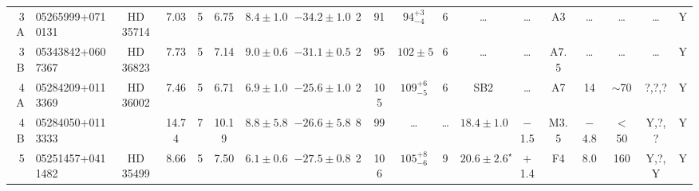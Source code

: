\documentclass[usenatbib]{mnras}
\begin{document}
\begin{landscape}
\begin{table}
\begin{tabular}{r l c c c c c c c c c c c c c c c c c}
3A & 05265999+0710131   &   HD 35714                                            &   7.03    &     5         &   6.75                  &   $8.4\pm1.0$                        &   $-34.2\pm1.0$         &   2       &   91                   &   $94^{+3}_{-4}$          &   6             &   \dots                               & \dots                                       & A3        &   \dots                        &   \dots                             &   \dots                    &   Y\\
3B & 05343842+0607367   &   HD 36823                                            &   7.73    &     5         &   7.14                  &   $9.0\pm0.6$                        &   $-31.1\pm0.5$          &   2       &   95                   &   $102\pm5$            &   6             &   \dots                               &   \dots                                     & A7.5     &   \dots                        &   \dots                             &   \dots                    &   Y\\
4A & 05284209+0113369 & HD 36002                                                &   7.46     &    5         &   6.71                  &   $6.9\pm1.0$                        &   $-25.6\pm1.0$          &   2       &   105                 &   $109^{+6}_{-5}$       &  6              & SB2                                 &   \dots                                     &  A7       &   14                         &   $\sim$70                             &   ?,?,?                    &   Y\\
4B & 05284050+0113333   &                                                               &  14.74    &    7         &   10.19                 &           $8.8\pm5.8$                &    $-26.6\pm5.8$         &    8      &    99                  &   \dots                     &   \dots      &           $18.4\pm1.0$         &  $-$1.5                                    &   M3.5  &   $-$4.8                       &   $<$50                           &    Y,?,?                      &    Y\\
5 & 05251457+0411482   &   HD 35499                                              &   8.66     &    5         &      7.50                &      $6.1\pm0.6$                     &   $-27.5\pm0.8$          &    2      &   106                 &   $105^{+8}_{-6}$      &   9             &       $20.6\pm2.6^{\star}$    &   $+$1.4                                  &   F4       &   8.0                             &   160                               &   Y,?,Y                       &   Y\\

\end{tabular}
\end{table}
\end{landscape}
\end{document}

